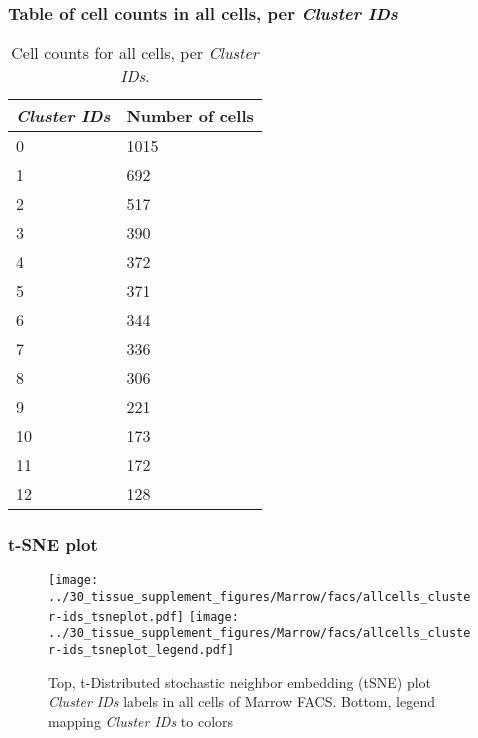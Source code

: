\subsubsection{Table of cell counts in all cells, per \emph{Cluster IDs}}\begin{table}[h]
\centering
\label{my-label}
\begin{tabular}{@{}ll@{}}
\toprule

\emph{Cluster IDs}& Number of cells \\ \midrule
0 & 1015 \\

1 & 692 \\

2 & 517 \\

3 & 390 \\

4 & 372 \\

5 & 371 \\

6 & 344 \\

7 & 336 \\

8 & 306 \\

9 & 221 \\

10 & 173 \\

11 & 172 \\

12 & 128 \\
\bottomrule
\end{tabular}
\caption{Cell counts for all cells, per \emph{Cluster IDs}.}
\end{table}

\clearpage
\subsubsection{t-SNE plot}
\begin{figure}[h]
\centering
\texttt{[image: ../30\_tissue\_supplement\_figures/Marrow/facs/allcells\_cluster-ids\_tsneplot.pdf]}
\texttt{[image: ../30\_tissue\_supplement\_figures/Marrow/facs/allcells\_cluster-ids\_tsneplot\_legend.pdf]}
\caption{Top, t-Distributed stochastic neighbor embedding (tSNE) plot  \emph{Cluster IDs} labels in all cells of Marrow FACS. Bottom, legend mapping \emph{Cluster IDs} to colors}
\end{figure}


